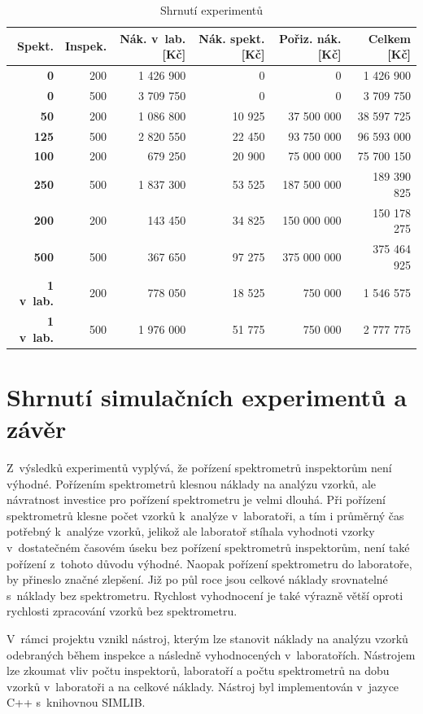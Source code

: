 \documentclass[11pt,a4paper]{article}
\begin{document}
\begin{table}[h!]
\begin{tabular}{|r|r|r|r|r|r|}  \hline
         \textbf{Spekt.}&\textbf{Inspek.} & \textbf{Nák. v~lab. [Kč]} & \textbf{Nák. spekt. [Kč]} & \textbf{Pořiz. nák. [Kč]} & \textbf{Celkem [Kč]} \\\hline
        \textbf{0}& 200        & 1 426 900 & 0 & 0 & 1 426 900\\\hline
        \textbf{0}& 500        & 3 709 750 & 0 & 0 & 3 709 750 \\\hline
        \textbf{50}& 200       & 1 086 800 & 10 925 & 37 500 000 & 38 597 725\\\hline
        \textbf{125}& 500      & 2 820 550 &22 450&93 750 000 &96 593 000\\\hline
        \textbf{100}& 200      & 679 250 & 20 900 &75 000 000&75 700 150 \\\hline
        \textbf{250}& 500      & 1 837 300 &53 525&187 500 000 &189 390 825\\\hline
        \textbf{200}& 200      & 143 450 &34 825&150 000 000&150 178 275 \\\hline
        \textbf{500}& 500      & 367 650 &97 275&375 000 000&375 464 925 \\\hline
        \textbf{1 v~lab.}& 200 & 778 050&18 525&750 000&1 546 575      \\\hline
        \textbf{1 v~lab.}& 500 & 1 976 000&51 775&750 000&2 777 775       \\\hline
      \end{tabular}
      \caption{Shrnutí experimentů}
      \label{souhrn}
\end{table}
\section{Shrnutí simulačních experimentů a závěr}
Z~výsledků experimentů vyplývá, že pořízení spektrometrů inspektorům není výhodné.
Pořízením spektrometrů klesnou náklady na analýzu vzorků, ale návratnost
investice pro pořízení spektrometru je velmi dlouhá. Při pořízení spektrometrů
klesne počet vzorků k~analýze v~laboratoři, a tím i průměrný čas potřebný k~analýze
vzorků, jelikož ale laboratoř stíhala vyhodnoti vzorky v~dostatečném časovém úseku 
bez pořízení spektrometrů inspektorům, není také pořízení z~tohoto důvodu výhodné.
Naopak pořízení spektrometru do laboratoře, by přineslo značné zlepšení. Již po půl
roce jsou celkové náklady srovnatelné s~náklady bez spektrometru. Rychlost vyhodnocení je
také výrazně větší oproti rychlosti zpracování vzorků bez spektrometru. 

V~rámci projektu vznikl nástroj, kterým lze stanovit náklady na analýzu vzorků
odebraných během inspekce a následně vyhodnocených v~laboratořích. Nástrojem lze zkoumat
vliv počtu inspektorů, laboratoří a počtu spektrometrů na dobu vzorků v~laboratoři a na
celkové náklady. Nástroj byl implementován v~jazyce C++ s~knihovnou SIMLIB. 

\newpage


\end{document}
